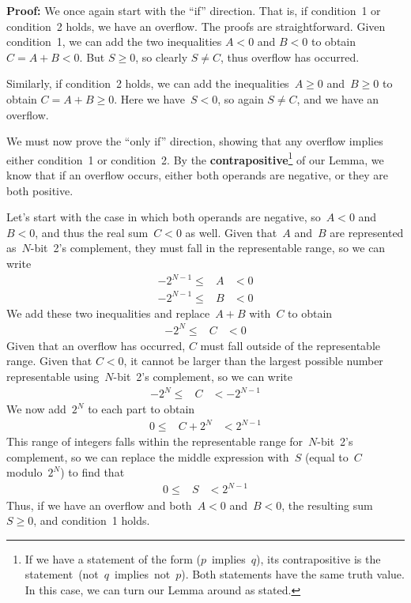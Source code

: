 {\bf Proof:}
%
We once again start with the ``if'' direction.  That is, if condition~1 
or condition~2 holds, we have an overflow.  The proofs are straightforward.
Given condition~1, we can add the two inequalities $A<0$ and $B<0$ to 
obtain $C=A+B<0$.  But $S\geq{0}$, so clearly $S\not=C$, thus overflow 
has occurred.

Similarly, if condition~2 holds, we can add the inequalities~$A\geq{0}$
and~$B\geq{0}$ to obtain $C=A+B\geq{0}$.  Here we have~$S<0$, so again
$S\not=C$, and we have an overflow.

We must now prove the ``only if'' direction, showing that any overflow
implies either condition~1 or condition~2.  By the 
{\bf contrapositive}\footnote{If we have a statement of the form
($p$~implies~$q$), its contrapositive is the 
statement~(not~$q$~implies~not~$p$).
Both statements have the same truth value.  In this case, we can turn
our Lemma around as stated.} of our
Lemma, we know that if an overflow occurs, either both operands are 
negative, or they are both positive.

%

Let's start with the case in which both operands are negative, so~$A<0$
and~$B<0$, and thus the real sum~$C<0$ as well.  Given that~$A$ and~$B$
are represented as~\mbox{$N$-bit}~2's complement, they must fall in
the representable range, so we can write
%
\begin{eqnarray*}
-2^{N-1} \leq & A & < 0\\
-2^{N-1} \leq & B & < 0
\end{eqnarray*}
%
We add these two inequalities and replace~$A+B$ with~$C$ to obtain
%
\begin{eqnarray*}
-2^N \leq & C & < 0
\end{eqnarray*}
%
Given that an overflow has occurred, $C$ must fall outside of the 
representable range.  Given that $C<0$, it cannot be larger than the
largest possible number representable using~\mbox{$N$-bit}~2's
complement, so we can write
%
\begin{eqnarray*}
-2^N \leq & C & < -2^{N-1}
\end{eqnarray*}
%
We now add~$2^N$ to each part to obtain
%
\begin{eqnarray*}
0 \leq & C + 2^N & < 2^{N-1}
\end{eqnarray*}
%
This range of integers falls within the representable range 
for~\mbox{$N$-bit}~2's complement, so we can replace the middle
expression with~$S$ (equal to~$C$ modulo~$2^N$) to find that
%
\begin{eqnarray*}
0 \leq & S & < 2^{N-1}
\end{eqnarray*}
%
Thus, if we have an overflow and both~$A<0$ and~$B<0$, the resulting
sum~$S\geq{0}$, and condition~1 holds.

